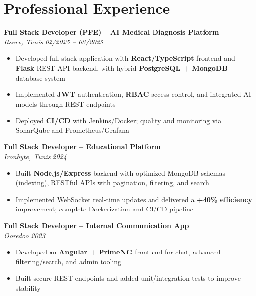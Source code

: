 \documentclass[10pt,a4paper]{article}
\begin{document}
\vspace{6pt}

\section*{Professional Experience}
{\small

\textbf{Full Stack Developer (PFE) -- AI Medical Diagnosis Platform}\\[1pt]
\textit{Itserv, Tunis} \hfill \textit{02/2025 -- 08/2025}
\begin{itemize}
  \item Developed full stack application with \textbf{React/TypeScript} frontend and \textbf{Flask} REST API backend, with hybrid \textbf{PostgreSQL + MongoDB} database system
  \item Implemented \textbf{JWT} authentication, \textbf{RBAC} access control, and integrated AI models through REST endpoints
  \item Deployed \textbf{CI/CD} with Jenkins/Docker; quality and monitoring via SonarQube and Prometheus/Grafana
\end{itemize}

\vspace{3pt}
\textbf{Full Stack Developer -- Educational Platform}\\[1pt]
\textit{Ironbyte, Tunis} \hfill \textit{2024}
\begin{itemize}
  \item Built \textbf{Node.js/Express} backend with optimized MongoDB schemas (indexing), RESTful APIs with pagination, filtering, and search
  \item Implemented WebSocket real-time updates and delivered a \textbf{+40\% efficiency} improvement; complete Dockerization and CI/CD pipeline
\end{itemize}

\vspace{3pt}
\textbf{Full Stack Developer -- Internal Communication App}\\[1pt]
\textit{Ooredoo} \hfill \textit{2023}
\begin{itemize}
  \item Developed an \textbf{Angular + PrimeNG} front end for chat, advanced filtering/search, and admin tooling
  \item Built secure REST endpoints and added unit/integration tests to improve stability
\end{itemize}

}
\end{document}
